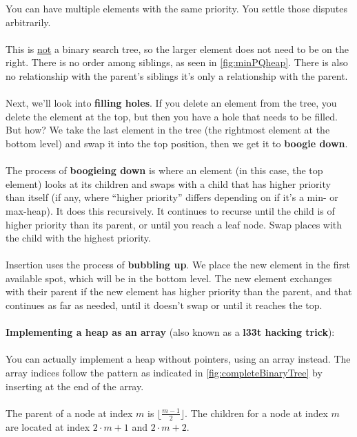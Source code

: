 \documentclass[]{article}
\theoremstyle{definition}
\begin{document}
\begin{enumerate}
						You can have multiple elements with the same priority. You settle those disputes arbitrarily.
						\\ \\
						This is \underline{not} a binary search tree, so the larger element does not need to be on the right. There is no order among siblings, as seen in \ref{fig:minPQheap}. There is also no relationship with the parent's siblings \textendash{} it's only a relationship with the parent.
						\\ \\
						Next, we'll look into \textbf{filling holes}. If you delete an element from the tree, you delete the element at the top, but then you have a hole that needs to be filled. But how? We take the last element in the tree (the rightmost element at the bottom level) and swap it into the top position, then we get it to \textbf{boogie down}.
						\\ \\
						The process of \textbf{boogieing down} is where an element (in this case, the top element) looks at its children and swaps with a child that has higher priority than itself (if any, where ``higher priority'' differs depending on if it's a min- or max-heap). It does this recursively. It continues to recurse until the child is of higher priority than its parent, or until you reach a leaf node. Swap places with the child with the highest priority.
						\\ \\
						Insertion uses the process of \textbf{bubbling up}. We place the new element in the first available spot, which will be in the bottom level. The new element exchanges with their parent if the new element has higher priority than the parent, and that continues as far as needed, until it doesn't swap or until it reaches the top.
						\\ \\
						\textbf{Implementing a heap as an array} (also known as a \textbf{l33t hacking trick}):
						\\ \\
						You can actually implement a heap without pointers, using an array instead. The array indices follow the pattern as indicated in \ref{fig:completeBinaryTree} by inserting at the end of the array.
						\\ \\
						The parent of a node at index $m$ is $\lfloor \frac{m - 1}{2} \rfloor$. The children for a node at index $m$ are located at index $2 \cdot m + 1$ and $2 \cdot m + 2$.

\end{enumerate}
\end{document}
